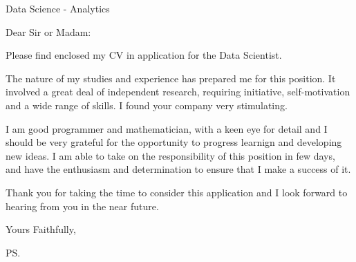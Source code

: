 \documentclass{letter}
\begin{document}
\begin{letter}{Data Science - Analytics}
\opening{Dear Sir or Madam:}

    Please find enclosed my CV in application for the Data Scientist.

    The nature of my studies and experience has prepared me for this position. It involved a great deal of independent research, requiring initiative, self-motivation and a wide range of skills. I found your company very stimulating.

    I am good programmer and mathematician, with a keen eye for detail and I should be very grateful for the opportunity to progress learnign and developing new ideas. I am able to take on the responsibility of this position in few days, and have the enthusiasm and determination to ensure that I make a success of it.

    Thank you for taking the time to consider this application and I look forward to hearing from you in the near future.


\closing{Yours Faithfully,}

\ps

\end{letter}
\end{document}
